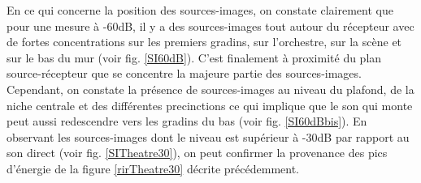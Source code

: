 %
En ce qui concerne la position des sources-images, on constate clairement que pour une mesure à -60dB, il y a des sources-images tout autour du récepteur avec de fortes concentrations sur les premiers gradins, sur l'orchestre, sur la scène et sur le bas du mur (voir fig. \ref{SI60dB}). C'est finalement à proximité du plan source-récepteur que se concentre la majeure partie des sources-images. Cependant, on constate la présence de sources-images au niveau du plafond, de la niche centrale et des différentes \glspl{precinction} ce qui implique que le son qui monte peut aussi redescendre vers les gradins du bas (voir fig. \ref{SI60dBbis}). En observant les sources-images dont le niveau est supérieur à -30dB par rapport au son direct (voir fig. \ref{SITheatre30}), on peut confirmer la provenance des pics d'énergie de la figure \ref{rirTheatre30} décrite précédemment. 



